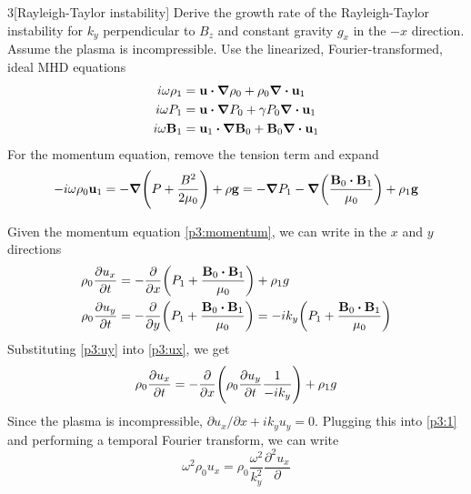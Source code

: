 \documentclass[12pt]{article}
\begin{document}
\begin{problem}{3}[Rayleigh-Taylor instability]
Derive the growth rate of the Rayleigh-Taylor instability for $k_y$
perpendicular to $B_z$ and constant gravity $g_x$ in the $-x$ direction. Assume
the plasma is incompressible. Use the linearized, Fourier-transformed, ideal MHD
equations
\begin{subequations}
    \begin{align}
        i\omega\rho_1&=\vb{u}\vdot\grad\rho_0+\rho_0\div{\vb{u}_1} \\
        i\omega P_1&=\vb{u}\vdot\grad P_0+\gamma P_0\div{\vb{u}_1}\\
        i\omega\vb{B}_1&=\vb{u}_1\vdot\grad\vb{B}_0+\vb{B}_0\div{\vb{u}_1}
    \end{align}
\end{subequations}
For the momentum equation, remove the tension term and expand
\begin{equation}\label{p3:momentum}
    -i\omega\rho_0\vb{u}_1=-\grad\qty(P+\frac{B^2}{2\mu_0})+\rho\vb{g}
    =-\grad P_1-\grad\qty(\frac{\vb{B}_0\vdot\vb{B}_1}{\mu_0})+\rho_1\vb{g}
\end{equation}
\begin{solution}
Given the momentum equation \eqref{p3:momentum}, we can write in the $x$ and $y$
directions
\begin{subequations}
    \begin{align}
        \rho_0\frac{\partial u_x}{\partial t}
        &=-\frac{\partial}{\partial
        x}\qty(P_1+\frac{\vb{B}_0\vdot\vb{B}_1}{\mu_0})+\rho_1 g \label{p3:ux}\\
        \rho_0\frac{\partial u_y}{\partial t}
        &=-\frac{\partial}{\partial
        y}\qty(P_1+\frac{\vb{B}_0\vdot\vb{B}_1}{\mu_0})
        =-ik_y\qty(P_1+\frac{\vb{B}_0\vdot\vb{B}_1}{\mu_0})\label{p3:uy}
    \end{align} 
\end{subequations}
Substituting \eqref{p3:uy} into \eqref{p3:ux}, we get
\begin{align}\label{p3:1}
    \rho_0\frac{\partial u_x}{\partial t}
    =-\frac{\partial}{\partial x}\qty(\rho_0\frac{\partial u_y}{\partial
    t}\frac1{-ik_y})+\rho_1g
\end{align}
Since the plasma is incompressible, $\partial u_x /\partial x+ik_yu_y=0$.
Plugging this into \eqref{p3:1} and performing a temporal Fourier transform, we
can write
\begin{equation}
    \omega^2\rho_0u_x=\rho_0\frac{\omega^2}{k_y^2}\frac{\partial^2u_x}{\partial
}
\end{equation}
\end{solution}
\end{problem}
\end{document}
